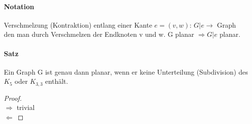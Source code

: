 \paragraph{Notation} Verschmelzung (Kontraktion) entlang einer Kante $ e=(v,w) $: $ G|e \rightarrow$ Graph den man durch Verschmelzen der Endknoten v und w. G planar $\Rightarrow G|e $ planar.
\paragraph{Satz} Ein Graph G ist genau dann planar, wenn er keine Unterteilung (Subdivision) des $ K_5 $ oder $ K_{3,3} $ enthält.

\begin{proof} \\
$ \Rightarrow $ trivial \\
$ \Leftarrow $


\end{proof}










 
